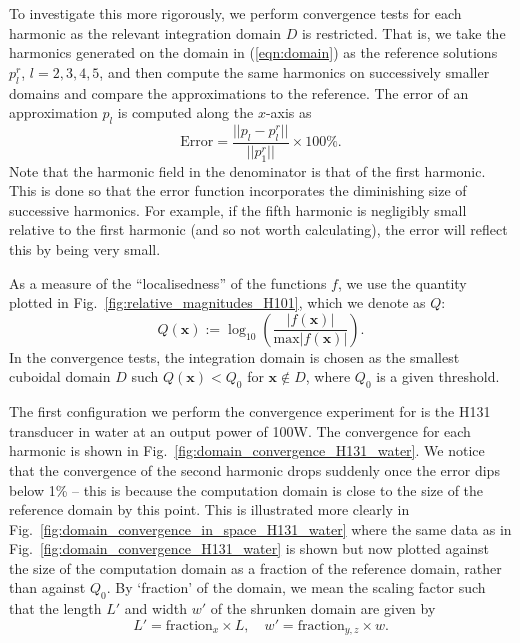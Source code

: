 \documentclass[11pt]{article}
\numberwithin{equation}{section}
\newcommand{\bx}{\mathbf{x}}
\newcommand{\red}[1]{{\color{black} #1}}
\begin{document}
To investigate this more rigorously, we perform convergence tests for each
harmonic as the relevant integration domain $D$ is restricted. That is, we take
the harmonics generated on the domain in (\ref{eqn:domain}) as the reference 
solutions $p_l^r$, $l=2,3,4,5$, and then compute the same harmonics on successively 
smaller domains and compare the approximations to the reference. 
The error of an approximation $p_l$ is computed along the $x$-axis as
\begin{equation}
    \text{Error} = \frac{||p_l-p_l^r||}
    {||p_1^r||}\times 100\%.
\end{equation}
Note that the harmonic
field in the denominator is that of the first harmonic. This is done so that the 
error function incorporates the diminishing size of successive harmonics. For example,
if the fifth harmonic is negligibly small relative to the first harmonic (and so
not worth calculating), the error will reflect this by being very small.

As a measure of the ``localisedness'' of the functions $f$, we use the quantity 
plotted in Fig.~\ref{fig:relative_magnitudes_H101}, which we denote as $Q$:
\begin{equation}
    Q(\bx) := \log_{10}\left(\frac{|f(\bx)|}{\text{max}|f(\bx)|}\right).
    \label{eqn:Q}
\end{equation}
In the convergence tests, the integration domain is chosen as the smallest 
cuboidal domain $D$ such $Q(\bx)<Q_0$ for $\bx\notin D$, where $Q_0$ is a 
given threshold.

The first configuration we \red{perform the convergence experiment for} is the 
H131 transducer in water at an output power of 100W. The convergence for each harmonic is shown in Fig.~\ref{fig:domain_convergence_H131_water}.
We notice that the convergence of the second harmonic drops suddenly 
once the error dips below 1\% -- this is because the computation domain 
is close to the size of the reference domain by this point. This is illustrated 
more clearly in Fig.~\ref{fig:domain_convergence_in_space_H131_water} where the 
same data as in Fig.~\ref{fig:domain_convergence_H131_water} is shown but now 
plotted against the size of the computation domain as a fraction of the reference 
domain, rather than against $Q_0$. \red{By `fraction' of the domain, we mean 
the scaling factor such that the length $L'$ and width $w'$ of the shrunken domain 
are given by 
\[
    L' = \text{fraction}_x\times L,\quad w' = \text{fraction}_{y,z}\times w.    
\]
}
\end{document}
